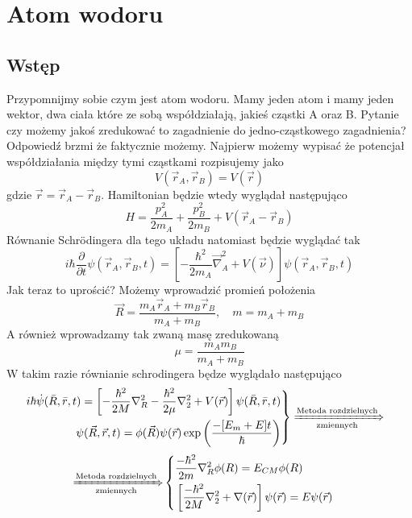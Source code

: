\section{Atom wodoru}
\subsection{Wstęp}
Przypomnijmy sobie czym jest atom wodoru. Mamy jeden atom i mamy jeden wektor, dwa ciała które ze sobą współdziałają, jakieś cząstki A oraz B. Pytanie czy możemy jakoś zredukować to zagadnienie do jedno-cząstkowego zagadnienia? Odpowiedź brzmi że faktycznie możemy. Najpierw możemy wypisać że potencjał współdziałania między tymi cząstkami rozpisujemy jako 
$$
V(\vec{r}_A, \vec{r}_B) = V(\vec{r})
$$
gdzie $\vec{r} = \vec{r}_A - \vec{r}_B$. Hamiltonian będzie wtedy wyglądał następująco
\begin{equation*}
	H =  \frac{p_{A}^{2}}{2 m_{A}}+\frac{p_{B}^{2}}{2 m_{B}} + V(\vec{r} _A- \vec{r}_B)
\end{equation*}
Równanie Schrödingera dla tego układu natomiast będzie wyglądać tak
\begin{equation*}
	i \hbar \frac{\partial}{\partial t} \psi \left(\vec{r}_{A}, \vec{r}_{B}, t\right) = \left[-\frac{\hbar^{2}}{2 m_{A}} \vec{\nabla}_{A}^{2}+V(\vec{\nu})\right] \psi \left(\vec{r}_{A}, \vec{r}_{B}, t\right)
\end{equation*}
Jak teraz to uprościć? Możemy wprowadzić promień położenia	
\begin{equation*}
	\vec{R}=\frac{m_{A} \vec{r}_{A}+m_{B} \vec{r}_{B}}{m_{A}+m_{B}}, \quad m = m_A + m_B
\end{equation*}
A również wprowadzamy tak zwaną masę zredukowaną
\begin{equation*}
	\mu = \frac{m_A m_B}{m_A + m_B}
\end{equation*}
W takim razie równianie schrodingera będze wyglądało następująco
\begin{align*}
	&\left.
	\begin{aligned}
		i \hbar\dot{\psi}(\bar{R}, \bar{r}, t)  =  \left[-\frac{\hbar^{2}}{2 M} \nabla_{R}^{2}-\frac{\hbar^{2}}{2 \mu} \nabla_{2}^{2}+V(\vec{r})\right]  \psi(\bar{R}, \bar{r}, t) \\
		\psi(\vec{R}, \vec{r}, t)=\phi(\vec{R}) \psi(\vec{r}) \exp \left(\frac{-[E_m + E]t}{\hbar}\right)
	\end{aligned}
	\right\}
	\xRightarrow[\text{zmiennych}]{\text{Metoda rozdzielnych}}
\end{align*}
\begin{align*}
	\xRightarrow[\text{zmiennych}]{\text{Metoda rozdzielnych}}
	&\left\{
	\begin{aligned}
		&\frac{-\hbar^{2}}{2 m} \nabla_{R}^{2} \phi(R)=E_{CM} \phi(R)\\
		&\left[\frac{-\hbar^{2}}{2 M} \nabla_{2}^{2}+\nabla(\vec{r})\right] \psi(\vec{r})=E \psi(\vec{r})
	\end{aligned}
	\right.
\end{align*}
